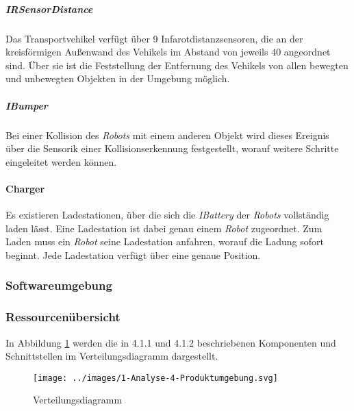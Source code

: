     \subparagraph{IRSensorDistance}\label{irsensordistance}

    Das Transportvehikel verfügt über 9 Infarotdistanzsensoren, die an der
    kreisförmigen Außenwand des Vehikels im Abstand von jeweils 40
    angeordnet sind. Über sie ist die Feststellung der Entfernung des
    Vehikels von allen bewegten und unbewegten Objekten in der Umgebung
    möglich.

    \subparagraph{IBumper}\label{ibumper}

    Bei einer Kollision des \emph{Robots} mit einem anderen Objekt wird
    dieses Ereignis über die Sensorik einer Kollisionserkennung festgestellt, worauf
    weitere Schritte eingeleitet werden können.

    \paragraph{Charger}\label{charger}

    Es existieren Ladestationen, über die sich die \emph{IBattery} der
    \emph{Robots} vollständig laden lässt. Eine Ladestation ist dabei genau
    einem \emph{Robot} zugeordnet. Zum Laden muss ein \emph{Robot} seine
    Ladestation anfahren, worauf die Ladung sofort beginnt. Jede Ladestation
    verfügt über eine genaue Position.

    \subsubsection{Softwareumgebung}



\subsubsection{Ressourcenübersicht}
    In Abbildung \ref{fig:4-1-3-verteilungsdiagramm} werden die in 4.1.1 und 4.1.2 beschriebenen
    Komponenten und Schnittstellen im Verteilungsdiagramm dargestellt.

    \begin{figure}[H]
      \centering
      \texttt{[image: ../images/1-Analyse-4-Produktumgebung.svg]}
      \caption{Verteilungsdiagramm}
      \label{fig:4-1-3-verteilungsdiagramm}
    \end{figure}
